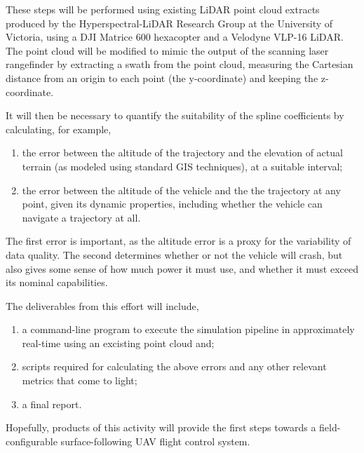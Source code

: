 \documentclass[doc]{apa6}
\begin{document}
These steps will be performed using existing LiDAR point cloud extracts produced by the Hyperspectral-LiDAR Research Group at the University of Victoria, using a DJI Matrice 600 hexacopter and a Velodyne VLP-16 LiDAR. The point cloud will be modified to mimic the output of the scanning laser rangefinder by extracting a swath from the point cloud, measuring the Cartesian distance from an origin to each point (the y-coordinate) and keeping the z-coordinate.

It will then be necessary to quantify the suitability of the spline coefficients by calculating, for example,

\begin{enumerate}
\item the error between the altitude of the trajectory and the elevation of actual terrain (as modeled using standard GIS techniques), at a suitable interval;
\item the error between the altitude of the vehicle and the the trajectory at any point, given its dynamic properties, including whether the vehicle can navigate a trajectory at all.
\end{enumerate}

The first error is important, as the altitude error is a proxy for the variability of data quality. The second determines whether or not the vehicle will crash, but also gives some sense of how much power it must use, and whether it must exceed its nominal capabilities.

The deliverables from this effort will include,

\begin{enumerate}
\item a command-line program to execute the simulation pipeline in approximately real-time using an excisting point cloud and;
\item scripts required for calculating the above errors and any other relevant metrics that come to light;
\item a final report.
\end{enumerate}

Hopefully, products of this activity will provide the first steps towards a field-configurable surface-following UAV flight control system.

\newpage

\printbibliography
\end{document}

